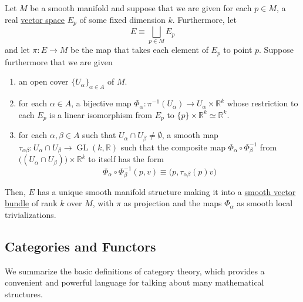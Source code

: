 \documentclass{article}
\DeclareMathOperator{\GL}{GL}
\newcounter{definition}[section]
\begin{document}
  \begin{lemma}
    \label{thm:vector-bundle-construction-lemma}
  Let $M$ be a smooth manifold and suppose that we are given for each $p \in M$, a real \hyperref[lin-def:vector-space]{vector space} $E_p$ of some fixed dimension $k$. Furthermore, let 
  \begin{equation}
    E \equiv \bigsqcup_{p \in M} E_p
  \end{equation}
  and let $\pi: E \to M$ be the map that takes each element of $E_p$ to point $p$. Suppose furthermore that we are given
  \begin{enumerate}
      \item an open cover $\{U_\alpha\}_{\alpha \in A}$ of $M$. 
      \item for each $\alpha \in A$, a bijective map $\Phi_\alpha : \pi^{-1} (U_\alpha) \to U_\alpha \times \mathbb{R}^k$ whose restriction to each $E_p$ is a linear isomorphism from $E_p$ to $\{p\} \times \mathbb{R}^k \simeq \mathbb{R}^k$. 
      \item for each $\alpha, \beta \in A$ such that $U_\alpha \cap U_\beta \neq \emptyset$, a smooth map $\tau_{\alpha \beta}: U_\alpha \cap U_\beta \to \GL(k, \mathbb{R})$ such that the composite map $\Phi_\alpha \circ \Phi_\beta^{-1}$ from $\big( (U_\alpha \cap U_\beta)\big) \times \mathbb{R}^k$ to itself has the form 
      \begin{equation}
        \Phi_\alpha \circ \Phi_\beta^{-1} (p, v) \equiv \big( p, \tau_{\alpha \beta} (p) v \big)
      \end{equation}
  \end{enumerate}
  Then, $E$ has a unique smooth manifold structure making it into a \hyperref[def:smooth-vector-bundle]{smooth vector bundle} of rank $k$ over $M$, with $\pi$ as projection and the maps $\Phi_\alpha$ as smooth local trivializations. 
  \end{lemma}

  \subsection{Categories and Functors}

    We summarize the basic definitions of category theory, which provides a convenient and powerful language for talking about many mathematical structures. 
\end{document}
